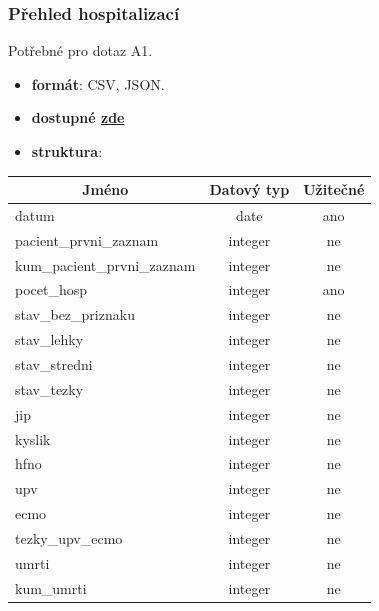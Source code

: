\documentclass[12pt]{article}
\begin{document}
\subsubsection*{Přehled hospitalizací}
Potřebné pro dotaz A1.
\begin{itemize}
    \item \textbf{formát}: CSV, JSON.
    \item \textbf{dostupné \href{https://onemocneni-aktualne.mzcr.cz/api/v2/covid-19/hospitalizace.csv}{zde}}
    \item \textbf{struktura}:
\end{itemize}
        \begin{center}
            \begin{tabular}{ |l|c|c| } 
                \hline
                \multicolumn{1}{|c|}{Jméno} & Datový typ & Užitečné \\
                \hline
                \hline
                datum & date & ano \\ 
                \hline
                pacient\_prvni\_zaznam & integer & ne \\ 
                \hline
                kum\_pacient\_prvni\_zaznam & integer & ne \\ 
                \hline
                pocet\_hosp & integer & ano \\ 
                \hline
                stav\_bez\_priznaku & integer & ne \\ 
                \hline
                stav\_lehky & integer & ne \\ 
                \hline
                stav\_stredni & integer & ne \\ 
                \hline
                stav\_tezky & integer & ne \\ 
                \hline
                jip & integer & ne \\ 
                \hline
                kyslik & integer & ne \\ 
                \hline
                hfno & integer & ne \\ 
                \hline
                upv & integer & ne \\ 
                \hline
                ecmo & integer & ne \\ 
                \hline
                tezky\_upv\_ecmo & integer & ne \\ 
                \hline
                umrti & integer & ne \\ 
                \hline
                kum\_umrti & integer & ne \\ 
                \hline
            \end{tabular}
        \end{center}
        
\end{document}
